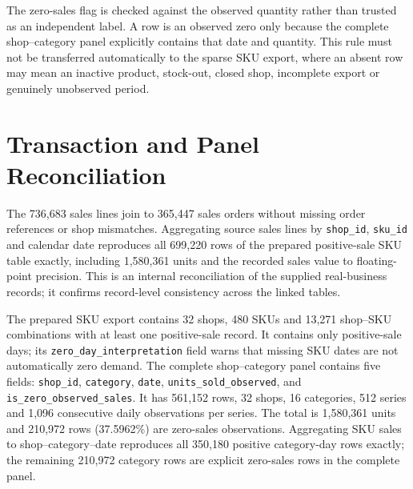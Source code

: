 \documentclass[a4paper,11pt,oneside]{book}
\theoremstyle{plain}
\theoremstyle{definition}
\theoremstyle{remark}
\begin{document}
The zero-sales flag is checked against the observed quantity rather than
trusted as an independent label. A row is an observed zero only because
the complete shop--category panel explicitly contains that date and
quantity. This rule must not be transferred automatically to the sparse
SKU export, where an absent row may mean an inactive product, stock-out,
closed shop, incomplete export or genuinely unobserved period.


\section{Transaction and Panel Reconciliation}

The 736,683 sales lines join to 365,447 sales orders without missing order
references or shop mismatches. Aggregating source sales lines by
\texttt{shop\_id}, \texttt{sku\_id} and calendar date reproduces all 699,220
rows of the prepared positive-sale SKU table exactly, including 1,580,361
units and the recorded sales value to floating-point precision. This is an internal reconciliation of the supplied real-business records; it confirms record-level consistency across the linked tables.

The prepared SKU export contains 32 shops, 480 SKUs and 13,271
shop--SKU combinations with at least one positive-sale record. It contains
only positive-sale days; its \texttt{zero\_day\_interpretation} field warns
that missing SKU dates are not automatically zero demand. The complete
shop--category panel contains five fields:
\texttt{shop\_id}, \texttt{category}, \texttt{date},
\texttt{units\_sold\_observed}, and
\texttt{is\_zero\_observed\_sales}. It has 561,152 rows, 32 shops, 16
categories, 512 series and 1,096 consecutive daily observations per
series. The total is 1,580,361 units and 210,972 rows (37.5962\%) are
zero-sales observations. Aggregating SKU sales to shop--category--date
reproduces all 350,180 positive category-day rows exactly; the remaining
210,972 category rows are explicit zero-sales rows in the complete panel.
\end{document}
